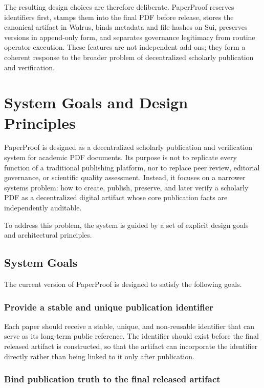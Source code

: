 \documentclass[journal]{IEEEtran}
\begin{document}
The resulting design choices are therefore deliberate. PaperProof reserves identifiers first, stamps them into the final PDF before release, stores the canonical artifact in Walrus, binds metadata and file hashes on Sui, preserves versions in append-only form, and separates governance legitimacy from routine operator execution. These features are not independent add-ons; they form a coherent response to the broader problem of decentralized scholarly publication and verification.

\section{System Goals and Design Principles}

PaperProof is designed as a decentralized scholarly publication and verification system for academic PDF documents. Its purpose is not to replicate every function of a traditional publishing platform, nor to replace peer review, editorial governance, or scientific quality assessment. Instead, it focuses on a narrower systems problem: how to create, publish, preserve, and later verify a scholarly PDF as a decentralized digital artifact whose core publication facts are independently auditable.

To address this problem, the system is guided by a set of explicit design goals and architectural principles.

\subsection{System Goals}

The current version of PaperProof is designed to satisfy the following goals.

\subsubsection{Provide a stable and unique publication identifier}

Each paper should receive a stable, unique, and non-reusable identifier that can serve as its long-term public reference. The identifier should exist before the final released artifact is constructed, so that the artifact can incorporate the identifier directly rather than being linked to it only after publication.

\subsubsection{Bind publication truth to the final released artifact}
\end{document}
